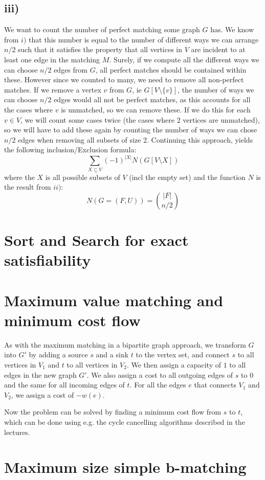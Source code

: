 \documentclass[a4paper]{article}
\begin{document}
\subsection*{iii)}
We want to count the number of perfect matching some graph $G$ has. We know from $i)$ that this number is equal to the number of different ways we can arrange $n/2$ such that it satisfies the property that all vertices in $V$ are incident to at least one edge in the matching $M$. Surely, if we compute all the different ways we can choose $n/2$ edges from $G$, all perfect matches should be contained within these. However since we counted to many, we need to remove all non-perfect matches. If
we remove a vertex $v$ from $G$, ie $G[V\setminus \{v\}]$, the number of ways we can choose $n/2$ edges would all not be perfect matches, as this accounts for all the cases where $v$ is unmatched, so we can remove these. If we do this for each $v\in V$, we will count some cases twice (the cases where 2 vertices are unmatched), so we will have to add these again by counting the number of ways we can chose $n/2$ edges when removing all subsets of size 2. Continuing this approach, yields the
following inclusion/Exclusion formula:
$$
\sum_{X\subseteq V} (-1)^{|X|} N(G[V \setminus X])
$$
where the $X$ is all possible subsets of $V$ (incl the empty set) and the function $N$ is the result from $ii)$:
$$
N(G=(F,U)) = \binom{|F|}{n/2}
$$
\section{Sort and Search for exact satisfiability }
\section{Maximum value matching and minimum cost flow}
As with the maximum matching in a bipartite graph approach, we transform $G$ into $G'$ by adding a source $s$ and a sink $t$ to the vertex set, and connect $s$ to all vertices in $V_1$ and $t$ to all vertices in $V_2$. We then assign a capacity of $1$ to all edges in the new graph $G'$. We also assign a cost to all outgoing edges of $s$ to $0$ and the same for all incoming edges of $t$. For all the edges $e$ that connects $V_1$ and $V_2$, we assign a cost of $-w(e)$.

Now the problem can be solved by finding a minimum cost flow from $s$ to $t$, which can be done using e.g. the cycle cancelling algorithms described in the lectures.
\section{Maximum size simple b-matching}
\end{document}
